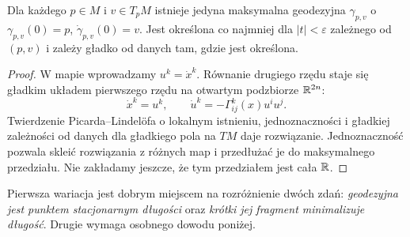 \begin{stwierdzenie}
\label{prop:geodezyjna-dane-poczatkowe}
Dla każdego $p\in M$ i $v\in T_pM$ istnieje
jedyna maksymalna geodezyjna $\gamma_{p,v}$
o $\gamma_{p,v}(0)=p$, $\dot\gamma_{p,v}(0)=v$.
Jest określona co najmniej dla $|t|<\varepsilon$
zależnego od $(p,v)$ i zależy gładko od danych
tam, gdzie jest określona.
\end{stwierdzenie}
\begin{proof}
W mapie wprowadzamy $u^k=\dot x^k$.
Równanie drugiego rzędu staje się gładkim
układem pierwszego rzędu na otwartym
podzbiorze $\mathbb{R}^{2n}$:
\[
 \dot x^k=u^k,
 \qquad \dot u^k=-\Gamma^k_{ij}(x)u^iu^j.
\]
Twierdzenie Picarda--Lindelöfa o lokalnym
istnieniu, jednoznaczności i gładkiej zależności
od danych dla gładkiego pola na $TM$ daje
rozwiązanie. Jednoznaczność pozwala skleić
rozwiązania z różnych map i przedłużać je
do maksymalnego przedziału. Nie zakładamy
jeszcze, że tym przedziałem jest cała $\mathbb{R}$.
\end{proof}

Pierwsza wariacja jest dobrym miejscem na
rozróżnienie dwóch zdań: \emph{geodezyjna jest
punktem stacjonarnym długości} oraz
\emph{krótki jej fragment minimalizuje długość}.
Drugie wymaga osobnego dowodu poniżej.

